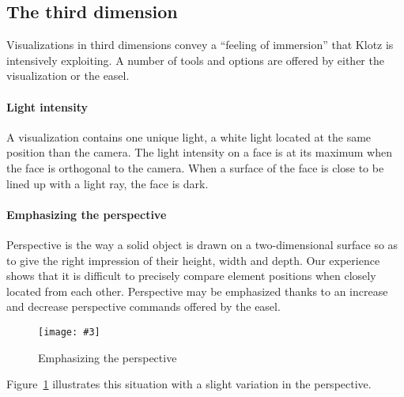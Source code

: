 \documentclass{sig-alternate}
\newcommand{\fig}[4]{
	\begin{figure}[#1]
		\centering
		\texttt{[image: \#3]}
		\caption{\label{fig:#3}#4}
	\end{figure}}
\newcommand{\seclabel}[1]{\label{sec:#1}}
\newcommand{\figref}[1]{Figure~\ref{fig:#1}}
\begin{document}
  


\subsection{The third dimension} \seclabel{3d}

Visualizations in third dimensions convey a ``feeling of immersion'' that Klotz is intensively exploiting. A number of tools and options are offered by either the visualization or the easel.

\paragraph{Light intensity}
A visualization contains one unique light, a white light located at the same position than the camera. The light intensity on a face is at its maximum when the face is orthogonal to the camera. When a surface of the face is close to be lined up with a light ray, the face is dark.

\paragraph{Emphasizing the perspective}
Perspective is the way a solid object is drawn on a two-dimensional surface so as to give the right impression of their height, width and depth. Our experience shows that it is difficult to precisely compare element positions when closely located from each other. Perspective may be emphasized thanks to an increase and decrease perspective commands offered by the easel.


\fig{h}{0.5}{perspective}{Emphasizing the perspective}

\figref{perspective} illustrates this situation with a slight variation in the perspective.
\end{document}
